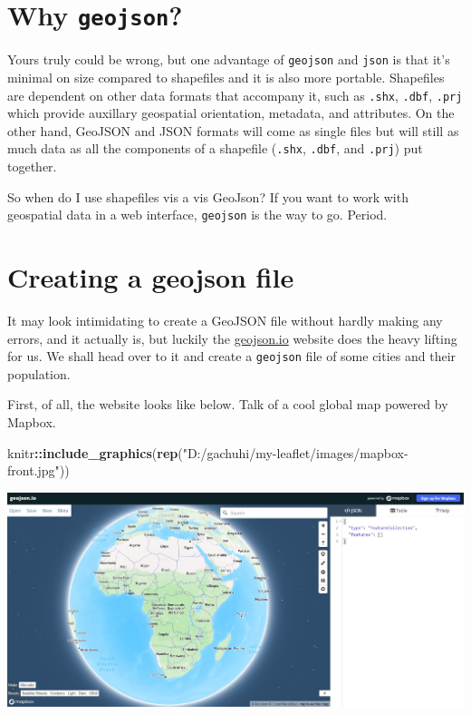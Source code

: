 \documentclass[
]{book}
\newenvironment{Shaded}{\begin{snugshade}}{\end{snugshade}}
\newcommand{\FunctionTok}[1]{\textcolor[rgb]{0.13,0.29,0.53}{\textbf{#1}}}
\newcommand{\NormalTok}[1]{#1}
\newcommand{\SpecialCharTok}[1]{\textcolor[rgb]{0.81,0.36,0.00}{\textbf{#1}}}
\newcommand{\StringTok}[1]{\textcolor[rgb]{0.31,0.60,0.02}{#1}}
\begin{document}
\hypertarget{why-geojson}{%
\section{\texorpdfstring{Why \texttt{geojson}?}{Why geojson?}}\label{why-geojson}}

Yours truly could be wrong, but one advantage of \texttt{geojson} and \texttt{json} is that it's minimal on size compared to shapefiles and it is also more portable. Shapefiles are dependent on other data formats that accompany it, such as \texttt{.shx}, \texttt{.dbf}, \texttt{.prj} which provide auxillary geospatial orientation, metadata, and attributes. On the other hand, GeoJSON and JSON formats will come as single files but will still as much data as all the components of a shapefile (\texttt{.shx}, \texttt{.dbf}, and \texttt{.prj}) put together.

So when do I use shapefiles vis a vis GeoJson? If you want to work with geospatial data in a web interface, \texttt{geojson} is the way to go. Period.

\hypertarget{creating-a-geojson-file}{%
\section{Creating a geojson file}\label{creating-a-geojson-file}}

It may look intimidating to create a GeoJSON file without hardly making any errors, and it actually is, but luckily the \href{https://geojson.io/\#map=2/0/20}{geojson.io} website does the heavy lifting for us. We shall head over to it and create a \texttt{geojson} file of some cities and their population.

First, of all, the website looks like below. Talk of a cool global map powered by Mapbox.

\begin{Shaded}
\begin{Highlighting}[]
\NormalTok{knitr}\SpecialCharTok{::}\FunctionTok{include\_graphics}\NormalTok{(}\FunctionTok{rep}\NormalTok{(}\StringTok{"D:/gachuhi/my{-}leaflet/images/mapbox{-}front.jpg"}\NormalTok{))}
\end{Highlighting}
\end{Shaded}

\includegraphics{../images/mapbox-front.jpg}
\end{document}
